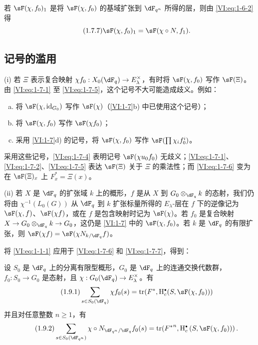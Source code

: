 若 $\sF(\chi,f_0)_1$ 是将 $\sF(\chi,f_0)$ 的基域扩张到 $\dF_{q^n}$ 所得的层，则由 \eqref{VI:eq:1-6-2} 得
\begin{equation*}\tag{1.7.7}\label{VI:eq:1-7-7}
  \sF(\chi,f_0)_1 = \sF(\chi\circ N,f_1) \text{.}
\end{equation*}

\subsection{记号的滥用}\label{VI:1-8}

(i) 若 $\Xi$ 表示复合映射 $\chi f_0:X_0(\dF_q) \to E_\lambda^\times$，有时将 $\sF(\chi,f_0)$ 写作 $\sF(\Xi)$。由 \eqref{VI:eq:1-7-1} 至 \eqref{VI:eq:1-7-5}，这个记号不大可能造成歧义。例如：
\begin{enumerate}[a)]
  \item 将 $\sF(\chi,\operatorname{id}_{G_0})$ 写作 $\sF(\chi)$（\ref{VI:1-7}b) 中已使用这个记号）；
  \item 将 $\sF(\chi,f_0)$ 写作 $\sF(\chi f_0)$；
  \item 采用 \ref{VI:1-7}d) 的记号，将 $\sF(\chi,f_0)$ 写作 $\sF(\prod \chi_i f_0^i)$。
\end{enumerate}

采用这些记号，\eqref{VI:eq:1-7-4} 表明记号 $\sF(\chi u_0 f_0)$ 无歧义；\eqref{VI:eq:1-7-1}、\eqref{VI:eq:1-7-2}、\eqref{VI:eq:1-7-5} 表达 $\sF(\Xi)$ 关于 $\Xi$ 的乘法性；而 \eqref{VI:eq:1-7-6} 变为在 $\sF(\Xi)_x$ 上 $F_x^\ast = \Xi(x)$。

(ii) 若 $X$ 是 $\dF_q$ 的扩张域 $k$ 上的概形，$f$ 是从 $X$ 到 $G_0\otimes_{\dF_q} k$ 的态射，我们仍将由 $\chi^{-1}(L_0(G))$ 从 $\dF_q$ 到 $k$ 扩张标量所得的 $E_\lambda$-层在 $f$ 下的逆像记为 $\sF(\chi,f)$、$\sF(\chi f)$，或在 $f$ 是包含映射时记为 $\sF(\chi)$。若 $f_0$ 是复合映射 $X\to G_0\otimes_{\dF_q} k \to G_0$，这仍是 \ref{VI:1-7} 中的 $\sF(\chi,f_0)$。若 $k$ 是 $\dF_q$ 的有限扩张，则 $\sF(\chi f) = \sF(\chi N_{k/\dF_q} f)$。

将 \eqref{VI:eq:1-1-1} 应用于 \eqref{VI:eq:1-7-6} 和 \eqref{VI:eq:1-7-7}，得到：

\begin{theorem_}\label{VI:1-9}
设 $S_0$ 是 $\dF_q$ 上的分离有限型概形，$G_0$ 是 $\dF_q$ 上的连通交换代数群，$f_0:S_0\to G_0$ 是态射，且 $\chi:G_0(\dF_q) \to E_\lambda^\times$。有
\begin{equation*}\tag{1.9.1}\label{VI:eq:1-9-1}
  \sum_{s\in S_0(\dF_q)} \chi f_0(s) = \tr(F^\ast,\h_c^\bullet(S,\sF(\chi,f_0)))
\end{equation*}
并且对任意整数 $n\geqslant 1$，有
\begin{equation*}\tag{1.9.2}\label{VI:eq:1-9-2}
  \sum_{s\in S_0(\dF_{q^n})} \chi\circ N_{\dF_{q^n}/\dF_q} f_0(s) = \tr({F^\ast}^n, \h_c^\bullet\left(S,\sF(\chi,f_0))\right) \text{.}
\end{equation*}
\end{theorem_}


